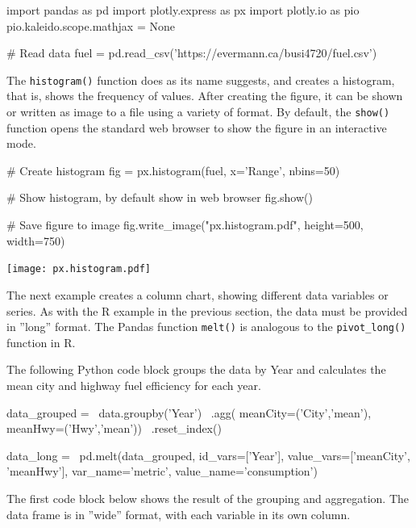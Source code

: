 \begin{pythoncode}
import pandas as pd
import plotly.express as px
import plotly.io as pio
pio.kaleido.scope.mathjax = None

# Read data
fuel = pd.read_csv('https://evermann.ca/busi4720/fuel.csv')
\end{pythoncode}

\noindent The \texttt{histogram()} function does as its name suggests, and creates a histogram, that is, shows the frequency of values. After creating the figure, it can be shown or written as image to a file using a variety of format. By default, the \texttt{show()} function opens the standard web browser to show the figure in an interactive mode.

\begin{pythoncode}
# Create histogram
fig = px.histogram(fuel, x='Range', nbins=50)

# Show histogram, by default show in web browser
fig.show()

# Save figure to image
fig.write_image("px.histogram.pdf", height=500, width=750)
\end{pythoncode}

\begin{center}
    \texttt{[image: px.histogram.pdf]}
\end{center}

The next example creates a column chart, showing different data variables or series. As with the R example in the previous section, the data must be provided in ''long'' format. The Pandas function \texttt{melt()} is analogous to the \texttt{pivot\_long()} function in R.

The following Python code block groups the data by Year and calculates the mean city and highway fuel efficiency for each year. 

\begin{pythoncode}
data_grouped = \
    data.groupby('Year') \
        .agg(
             meanCity=('City','mean'),
             meanHwy=('Hwy','mean')) \
        .reset_index()

data_long = \
    pd.melt(data_grouped, 
            id_vars=['Year'], 
            value_vars=['meanCity', 'meanHwy'], 
            var_name='metric', 
            value_name='consumption')
\end{pythoncode}

The first code block below shows the result of the grouping and aggregation. The data frame is in ''wide'' format, with each variable in its own column.

